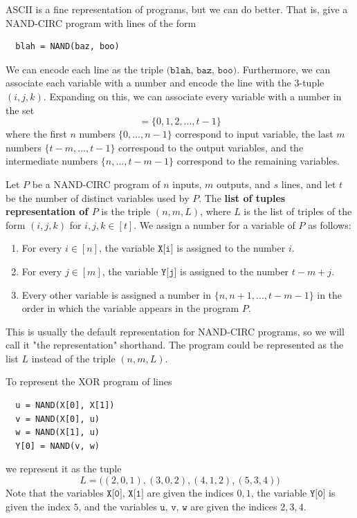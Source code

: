   ASCII is a fine representation of programs, but we can do better. That is, give a NAND-CIRC program with lines of the form 
  \begin{lstlisting}
  blah = NAND(baz, boo)
  \end{lstlisting}
  We can encode each line as the triple $\texttt{(blah, baz, boo)}$. Furthermore, we can associate each variable with a number and encode the line with the 3-tuple $(i, j, k)$. Expanding on this, we can associate every variable with a number in the set
  \begin{equation}
    [t] = \{0, 1, 2, ..., t-1\}
  \end{equation}
  where the first $n$ numbers $\{0, ..., n-1\}$ correspond to input variable, the last $m$ numbers $\{t-m, ..., t-1\}$ correspond to the output variables, and the intermediate numbers $\{n, ..., t-m-1\}$ correspond to the remaining variables. 

  \begin{definition}
    \label{def:list-of-tuples-representation}
  Let $P$ be a NAND-CIRC program of $n$ inputs, $m$ outputs, and $s$ lines, and let $t$ be the number of distinct variables used by $P$. The \textbf{list of tuples representation of $P$} is the triple $(n, m, L)$, where $L$ is the list of triples of the form $(i, j, k)$ for $i, j, k \in [t]$. We assign a number for a variable of $P$ as follows:
  \begin{enumerate}
      \item For every $i \in [n]$, the variable $\texttt{X[i]}$ is assigned to the number $i$. 
      \item For every $j \in [m]$, the variable $\texttt{Y[j]}$ is assigned to the number $t - m + j$.
      \item Every other variable is assigned a number in $\{n, n+1, ..., t-m-1\}$ in the order in which the variable appears in the program $P$. 
  \end{enumerate}
  This is usually the default representation for NAND-CIRC programs, so we will call it "the representation" shorthand. The program could be represented as the list $L$ instead of the triple $(n, m, L)$. 
  \end{definition}

  \begin{example}
    \label{ex:representing-the-xor-program-as-a-string}
  To represent the XOR program of lines 
  \begin{lstlisting}
  u = NAND(X[0], X[1])
  v = NAND(X[0], u) 
  w = NAND(X[1], u)
  Y[0] = NAND(v, w)
  \end{lstlisting}
  we represent it as the tuple 
  \begin{equation}
    L = \big( (2, 0, 1), (3, 0, 2), (4, 1, 2), (5, 3, 4)\big)
  \end{equation}
  Note that the variables $\texttt{X[0], X[1]}$ are given the indices $0, 1$, the variable $\texttt{Y[0]}$ is given the index $5$, and the variables $\texttt{u, v, w}$ are given the indices $2, 3, 4$. 
  \end{example}

